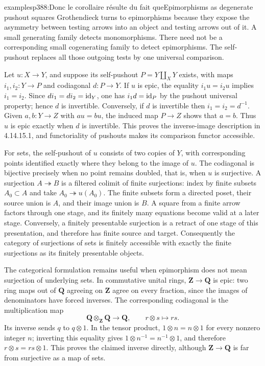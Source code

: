 \begin{dcomment}{examples}{p388:Donc le corollaire résulte du fait que}{Epimorphisms as degenerate pushout squares}
Grothendieck turns to epimorphisms because they expose the asymmetry between testing arrows into an object and testing arrows out of it. A small generating family detects monomorphisms. There need not be a corresponding small cogenerating family to detect epimorphisms. The self-pushout replaces all those outgoing tests by one universal comparison.

Let $u:X\to Y$, and suppose its self-pushout $P=Y\amalg_XY$ exists, with maps $i_1,i_2:Y\to P$ and codiagonal $d:P\to Y$. If $u$ is epic, the equality $i_1u=i_2u$ implies $i_1=i_2$. Since $di_1=di_2=\mathrm{id}_Y$, one has $i_1d=\mathrm{id}_P$ by the pushout universal property; hence $d$ is invertible. Conversely, if $d$ is invertible then $i_1=i_2=d^{-1}$. Given $a,b:Y\to Z$ with $au=bu$, the induced map $P\to Z$ shows that $a=b$. Thus $u$ is epic exactly when $d$ is invertible. This proves the inverse-image description in 4.14.15.1, and functoriality of pushouts makes its comparison functor accessible.

For sets, the self-pushout of $u$ consists of two copies of $Y$, with corresponding points identified exactly where they belong to the image of $u$. The codiagonal is bijective precisely when no point remains doubled, that is, when $u$ is surjective. A surjection $A\twoheadrightarrow B$ is a filtered colimit of finite surjections: index by finite subsets $A_0\subset A$ and take $A_0\twoheadrightarrow u(A_0)$. The finite subsets form a directed poset, their source union is $A$, and their image union is $B$. A square from a finite arrow factors through one stage, and its finitely many equations become valid at a later stage. Conversely, a finitely presentable surjection is a retract of one stage of this presentation, and therefore has finite source and target. Consequently the category of surjections of sets is finitely accessible with exactly the finite surjections as its finitely presentable objects.

The categorical formulation remains useful when epimorphism does not mean surjection of underlying sets. In commutative unital rings, $\mathbf Z\to\mathbf Q$ is epic: two ring maps out of $\mathbf Q$ agreeing on $\mathbf Z$ agree on every fraction, since the images of denominators have forced inverses. The corresponding codiagonal is the multiplication map
\[
 \mathbf Q\otimes_{\mathbf Z}\mathbf Q\longrightarrow\mathbf Q,
 \qquad r\otimes s\longmapsto rs.
\]
Its inverse sends $q$ to $q\otimes1$. In the tensor product, $1\otimes n=n\otimes1$ for every nonzero integer $n$; inverting this equality gives $1\otimes n^{-1}=n^{-1}\otimes1$, and therefore $r\otimes s=rs\otimes1$. This proves the claimed inverse directly, although $\mathbf Z\to\mathbf Q$ is far from surjective as a map of sets.


\end{dcomment}
